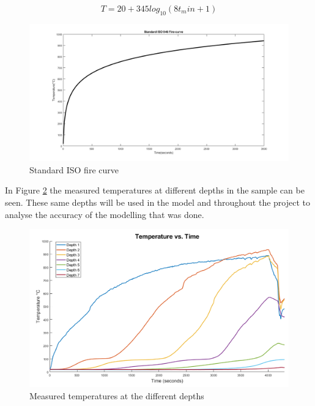 	\begin{equation}\label{firecurve_eq}
	T = 20 + 345log_{10}(8t_min+1)
	\end{equation}
	\begin{figure}
	\centering 
	\includegraphics[width=\linewidth]{figures/firecurve.png}
	\caption{Standard ISO fire curve}
	\label{firecurve_fig}
	\end{figure}
	In Figure \ref{measured_fig} the measured temperatures at different depths in the sample can be seen. 
	These same depths will be used in the model and throughout the project to analyse the accuracy of the modelling that was done.
	\begin{figure}[H]
	\label{measured_fig}
	\centering
	\includegraphics[width=\textwidth,]{figures/measured_plot.png}
	\caption{Measured temperatures at the different depths}
\end{figure}

